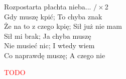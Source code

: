 \documentclass[a5paper, 10pt]{book}
\begin{document}
\begin{minipage}[t]{0.8\textwidth}
\hspace*{5mm}Rozpostarta płachta nieba... \hspace{5mm}$/\times$2\\

Gdy muszę kpić; To chyba znak\\
Że na to z czego kpię; Sił już nie mam\\
Sił mi brak; Ja chyba muszę\\
Nie musieć nic; I wtedy wiem\\
Co naprawdę muszę; A czego nie\\
\end{minipage}
\begin{minipage}[t]{0.2\textwidth}
\textcolor{red}{TODO}\\
\end{minipage}

\newpage
\end{document}
